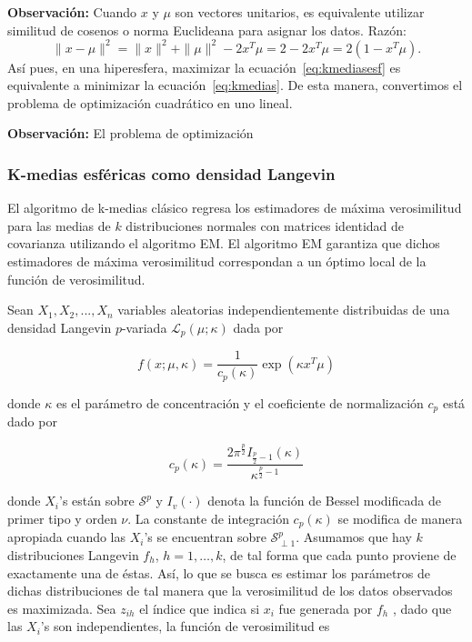 \textbf{Observación: } Cuando $x$ y $\mu$ son vectores unitarios, es equivalente utilizar similitud de cosenos o norma Euclideana para asignar los datos. Razón:
\begin{equation} \label{eq:euc2lin}
\| x-\mu \|^2=\|x\|^2 + \| \mu \|^2-2x^T \mu = 2-2x^T \mu = 2(1-x^T \mu).
\end{equation}
Así pues, en una hiperesfera, maximizar la ecuación~\ref{eq:kmediasesf} es equivalente a minimizar la ecuación~\ref{eq:kmedias}. De esta manera, convertimos el problema de optimización cuadrático en uno lineal.



\textbf{Observación:} El problema de optimización 

\subsubsection{K-medias esféricas como densidad Langevin}
El algoritmo de k-medias clásico regresa los estimadores de máxima verosimilitud para las medias de $k$ distribuciones normales con matrices identidad de covarianza utilizando el algoritmo EM. El algoritmo EM garantiza que dichos estimadores de máxima verosimilitud correspondan a un óptimo local de la función de verosimilitud.

Sean $X_{1},X_{2},...,X_{n}$ variables aleatorias independientemente distribuidas de una densidad Langevin $p$-variada $\mathcal{L}_{p}(\mu ; \kappa)$ dada por

\begin{equation}
f(x ; \mu , \kappa)=\dfrac{1}{c_{p}(\kappa)} \exp(\kappa x^T\mu)
\end{equation}

 donde $\kappa$  es el parámetro de concentración y el coeficiente de normalización $c_{p}$ está dado por
 
\begin{equation}
 c_{p}(\kappa)=\frac{2\pi^{\frac{p}{2}}I_{\frac{p}{2}-1}(\kappa)}{\kappa^{\frac{p}{2}-1}} 
\end{equation} 

  donde $X_{i}$'s están sobre $\mathcal{S}^{p}$ y $I_{v}(\cdot)$ denota la función de Bessel modificada de primer tipo y orden $\nu$. La constante de integración $c_{p}(\kappa)$ se modifica de manera apropiada cuando las $X_{i}$'s se encuentran sobre $\mathcal{S}_{\perp 1}^p$. Asumamos que hay $k$ distribuciones Langevin $f_{h}$, $h=1,\dots, k $, de tal forma que cada punto proviene de exactamente una de éstas. Así, lo que se busca es estimar los parámetros  de dichas distribuciones de tal manera que la verosimilitud de los datos observados es maximizada. Sea $z_{ih}$  el índice que indica si $x_{i}$ fue generada por $f_{h}$ , dado que las $X_{i}$'s son independientes, la función de verosimilitud es

